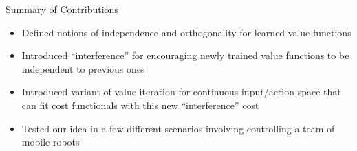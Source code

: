\begin{frame}{Summary of Contributions}
	\begin{itemize}
		\item{Defined notions of independence and orthogonality for learned value functions}
		\item{Introduced ``interference'' for encouraging newly trained value functions to be independent to previous ones}
		\item{Introduced variant of value iteration for continuous input/action space that can fit cost functionals with this new ``interference'' cost}
		\item{Tested our idea in a few different scenarios involving controlling a team of mobile robots}
	\end{itemize}
\end{frame}



